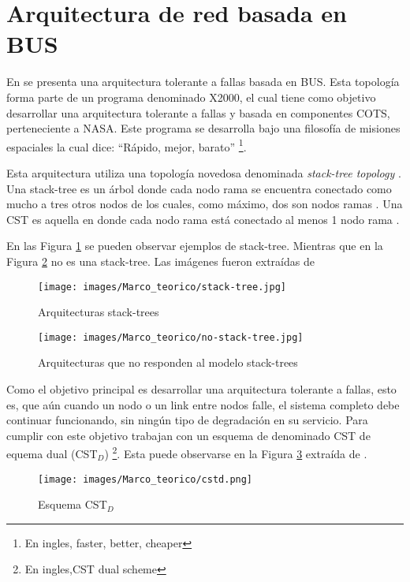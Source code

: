  \section{Arquitectura de red basada en BUS}
En \cite{Tai99} se presenta una arquitectura tolerante a fallas basada en BUS. Esta topología forma parte de un programa denominado X2000, el cual tiene como objetivo desarrollar una arquitectura tolerante a fallas y basada en componentes COTS, perteneciente a \ac{NASA}. Este programa se desarrolla bajo una filosofía de misiones espaciales la cual dice: ``Rápido, mejor, barato'' \footnote{En ingles, faster, better, cheaper}.

Esta arquitectura utiliza una topología novedosa denominada \textit{stack-tree topology} \citep{Chau99} \citep{Tai99}. Una stack-tree es un árbol donde cada nodo rama se encuentra conectado como mucho a tres otros nodos de los cuales, como máximo, dos son nodos ramas \citep{Tai99}. Una \ac{CST} es aquella en donde cada nodo rama está conectado al menos 1 nodo rama \citep{Tai99}.

En las Figura \ref{fig:stack-tree} se pueden observar ejemplos de stack-tree. Mientras que en la Figura \ref{fig:no-stack-tree} no es una stack-tree. Las imágenes fueron extraídas de \cite{Tai99}

\begin{figure}[h]
 \centering
 \texttt{[image: images/Marco\_teorico/stack-tree.jpg]}
  \caption{Arquitecturas stack-trees}
\label{fig:stack-tree}
\end{figure}

\begin{figure}[h]
 \centering
 \texttt{[image: images/Marco\_teorico/no-stack-tree.jpg]}
  \caption{Arquitecturas que no responden al modelo stack-trees}
\label{fig:no-stack-tree}
\end{figure}

Como el objetivo principal es desarrollar una arquitectura tolerante a fallas, esto es, que aún cuando un nodo o un link entre nodos falle, el sistema completo debe continuar funcionando, sin ningún tipo de degradación en su servicio. Para cumplir con este objetivo \cite{Tai99} trabajan con un esquema de denominado \ac{CST} de equema dual (\ac{CST}$_D$) \footnote{En ingles,\ac{CST} dual scheme}. Esta puede observarse en la Figura \ref{fig:cstd} extraída de \cite{Tai99}.

\begin{figure}[h]
 \centering
 \texttt{[image: images/Marco\_teorico/cstd.png]}
  \caption{Esquema CST$_D$}
\label{fig:cstd}
\end{figure}



